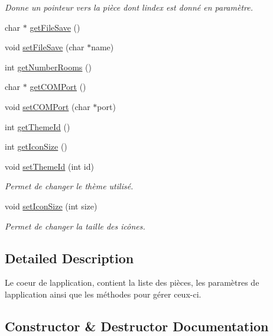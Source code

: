 \begin{DoxyCompactItemize}
\begin{DoxyCompactList}\small\item\em Donne un pointeur vers la pièce dont l\textquotesingle{}index est donné en paramètre. \end{DoxyCompactList}\item 
char $\ast$ \hyperlink{class_e_p_1_1_core_ad05dbd7220eed607ba316128c9ec7f3a}{get\+File\+Save} ()
\item 
void \hyperlink{class_e_p_1_1_core_a6af6b833aa08aa2d733f9b9590722d8c}{set\+File\+Save} (char $\ast$name)
\item 
int \hyperlink{class_e_p_1_1_core_a9fc190b88c92ee9844c59f840c3d8040}{get\+Number\+Rooms} ()
\item 
char $\ast$ \hyperlink{class_e_p_1_1_core_a5962fad30852b23d5bfcb5737b92f51a}{get\+C\+O\+M\+Port} ()
\item 
void \hyperlink{class_e_p_1_1_core_a9d1b1a45758cfd8ef092673bc28da5c7}{set\+C\+O\+M\+Port} (char $\ast$port)
\item 
int \hyperlink{class_e_p_1_1_core_adb173042f0f6b4c3a5682d3d0830fb55}{get\+Theme\+Id} ()
\item 
int \hyperlink{class_e_p_1_1_core_ab87c0abca00a328cc8a49e44f167867d}{get\+Icon\+Size} ()
\item 
void \hyperlink{class_e_p_1_1_core_a2f0999bd55f0f1b8d8113423e371c98e}{set\+Theme\+Id} (int id)
\begin{DoxyCompactList}\small\item\em Permet de changer le thème utilisé. \end{DoxyCompactList}\item 
void \hyperlink{class_e_p_1_1_core_aa170368ee75cf89bcaa45031a750d894}{set\+Icon\+Size} (int size)
\begin{DoxyCompactList}\small\item\em Permet de changer la taille des icônes. \end{DoxyCompactList}\end{DoxyCompactItemize}


\subsection{Detailed Description}
Le coeur de l\textquotesingle{}application, contient la liste des pièces, les paramètres de l\textquotesingle{}application ainsi que les méthodes pour gérer ceux-\/ci. 

\subsection{Constructor \& Destructor Documentation}
